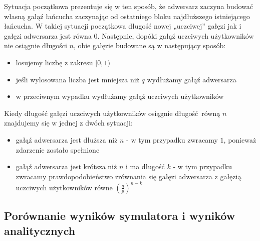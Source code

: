 \documentclass{article}
\begin{document}
    Sytuacja początkowa prezentuje się 
    w ten sposób, że adwersarz zaczyna budować własną gałąź łańcucha zaczynając od ostatniego bloku najdłuższego istniejącego łańcucha. 
    W takiej sytuacji początkowa długość nowej „uczciwej” gałęzi jak i gałęzi adwersarza jest równa $0$. Następnie, dopóki gałąź uczciwych 
    użytkowników nie osiągnie długości $n$, obie gałęzie budowane są w następujący sposób:
    \begin{itemize}
        \item losujemy liczbę z zakresu $[0, 1)$
        \item jeśli wylosowana liczba jest mniejsza niż $q$ wydłużamy gałąź adwersarza
        \item w przeciwnym wypadku wydłużamy gałąź uczciwych użytkowników 
    \end{itemize}
    Kiedy długość gałęzi uczciwych użytkowników osiągnie długość równą $n$ znajdujemy się w jednej z dwóch sytuacji:
    \begin{itemize}
        \item gałąź adwersarza jest dłuższa niż $n$ - w tym przypadku zwracamy $1$, ponieważ zdarzenie zostało spełnione
        \item gałąź adwersarza jest krótsza niż $n$ i ma długość $k$ - w tym przypadku zwracamy prawdopodobieństwo zrównania się gałęzi 
            adwersarza z gałęzią uczciwych użytkowników równe $(\frac{q}{p})^{n-k}$
    \end{itemize}


    \subsection{Porównanie wyników symulatora i wyników analitycznych}
\end{document}
